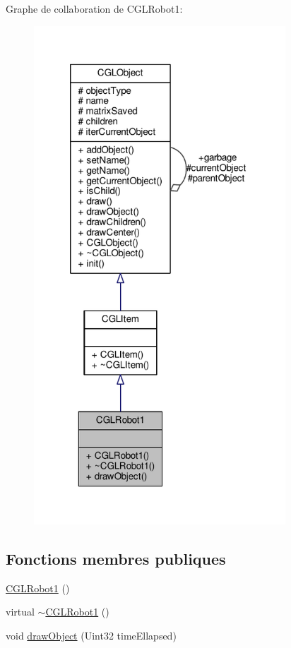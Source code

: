 Graphe de collaboration de C\-G\-L\-Robot1\-:\nopagebreak
\begin{figure}[H]
\begin{center}
\leavevmode
\includegraphics[width=267pt]{dc/de7/class_c_g_l_robot1__coll__graph}
\end{center}
\end{figure}
\subsection*{Fonctions membres publiques}
\begin{DoxyCompactItemize}
\item 
\hyperlink{class_c_g_l_robot1_a2b8077cc29b703e31d3ec85404cd3aed}{C\-G\-L\-Robot1} ()
\item 
virtual \hyperlink{class_c_g_l_robot1_accda840d084f72fb65d243dc047abc11}{$\sim$\-C\-G\-L\-Robot1} ()
\item 
void \hyperlink{class_c_g_l_robot1_a050d7fea4097a6634ef5feef26ae7865}{draw\-Object} (Uint32 time\-Ellapsed)
\end{DoxyCompactItemize}
